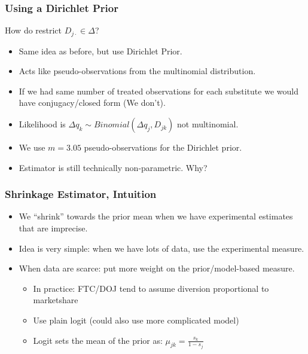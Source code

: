 \documentclass[aspectratio=169]{beamer}
\begin{document}
\begin{frame}
\frametitle{Using a Dirichlet Prior}
How do restrict $D_{j\cdot} \in \Delta$?
\begin{itemize}
\item Same idea as before, but use \alert{Dirichlet Prior}.
\item Acts like pseudo-observations from the \alert{multinomial} distribution.
\item If we had same number of treated observations for each substitute we would have conjugacy/closed form (We don't).
\item Likelihood is $\Delta q_{k} \sim Binomial(\Delta q_j, D_{jk})$ not \alert{multinomial}.
\item We use $m=3.05$ pseudo-observations for the Dirichlet prior.
\item Estimator is still technically \alert{non-parametric}. Why?
\end{itemize}
\end{frame}



\begin{frame}
\frametitle{Shrinkage Estimator, Intuition}
\begin{itemize}
\item We ``shrink'' towards the prior mean when we have experimental estimates that are imprecise.
\item Idea is very simple: when we have lots of data, use the experimental measure.
\item When data are scarce: put more weight on the prior/model-based measure.
\begin{itemize}
\item In practice: FTC/DOJ tend to assume diversion proportional to marketshare
\item Use plain logit (could also use more complicated model)
\item Logit sets the mean of the prior as: $\mu_{jk} = \frac{s_k}{1-s_{j}}$
\end{itemize}
\end{itemize}
\end{frame}
\end{document}
